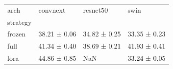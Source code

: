 \begin{tabular}{llll}
\toprule
arch & convnext & resnet50 & swin \\
strategy &  &  &  \\
\midrule
frozen & 38.21 ± 0.06 & 34.82 ± 0.25 & 33.35 ± 0.23 \\
full & 41.34 ± 0.40 & 38.69 ± 0.21 & 41.93 ± 0.41 \\
lora & 44.86 ± 0.85 & NaN & 33.24 ± 0.05 \\
\bottomrule
\end{tabular}
